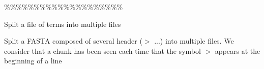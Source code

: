 \begin{description}
\%\%\%\%\%\%\%\%\%\%\%\%\%\%\%\%\%\%\%\%

Split a file of terms into multiple files

Split a FASTA composed of several header ($>$ ...) into multiple files. We consider that a chunk
has been seen each time that the symbol $>$ appears at the beginning of a line
\end{description}

